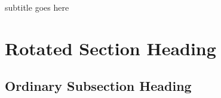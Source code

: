 \documentclass[12pt,foldmark]{leaflet}
\begin{document}
{subtitle goes here}

\withrotationtrue
\section{Rotated Section Heading}
\withrotationfalse
\subsection{Ordinary Subsection Heading}
\newpage

\newpage

\newpage




\end{document}
